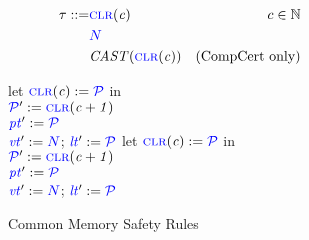 \documentclass{llncs}
\begin{document}
\begin{figure}
      \color{blue}
  \begin{subfigure}{\textwidth}
    \begin{minipage}{0.45\textwidth}
      \begin{align*}
        \tau ::= & \clr & c \in \mathbb{N} \\
        & \N \\
        & \mathit{CAST}(\clr) & \textnormal{(CompCert only)} \\
      \end{align*}
    \end{minipage}
    \scriptsize
    \begin{minipage}{0.3\textwidth}
      \localtruleblock
          {let \(\clr := \PCT\) in \\
            \(\PCT' := \clr[c+1]\) \\
            \(\pt' := \PCT\)\\
            \(\vt' := \N\);
            \(\lt' := \PCT\)
          }
      \malloctruleblock
          {let \(\clr := \PCT\) in \\
            \(\PCT' := \clr[c+1]\) \\
            \(\pt' := \PCT\) \\
            \(\vt' := \N\);
            \(\lt' := \PCT\)
          }
    \end{minipage}
    \begin{minipage}{0.2\textwidth}

    \end{minipage}

    \caption{Common Memory Safety Rules}
    \label{subfig:memgen}
  \end{subfigure}
  \begin{subfigure}{0.4\textwidth}
    \color{blue}
    \scriptsize


\end{subfigure}
\end{figure}
\end{document}
